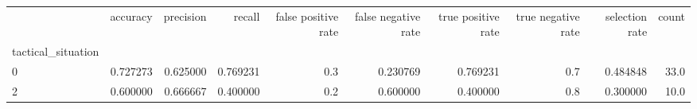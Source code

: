 \begin{tabular}{lrrrrrrrrr}
\toprule
{} &  accuracy &  precision &    recall &  false positive rate &  false negative rate &  true positive rate &  true negative rate &  selection rate &  count \\
tactical\_situation &           &            &           &                      &                      &                     &                     &                 &        \\
\midrule
0                  &  0.727273 &   0.625000 &  0.769231 &                  0.3 &             0.230769 &            0.769231 &                 0.7 &        0.484848 &   33.0 \\
2                  &  0.600000 &   0.666667 &  0.400000 &                  0.2 &             0.600000 &            0.400000 &                 0.8 &        0.300000 &   10.0 \\
\bottomrule
\end{tabular}
